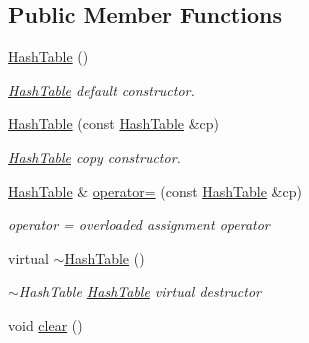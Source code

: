\subsection*{Public Member Functions}
\begin{DoxyCompactItemize}
\item 
\hypertarget{class_hash_table_adc3bf2b214c572819ba957ad314d7db3}{\hyperlink{class_hash_table_adc3bf2b214c572819ba957ad314d7db3}{Hash\-Table} ()}\label{class_hash_table_adc3bf2b214c572819ba957ad314d7db3}

\begin{DoxyCompactList}\small\item\em \hyperlink{class_hash_table}{Hash\-Table} default constructor. \end{DoxyCompactList}\item 
\hyperlink{class_hash_table_ac756b78d1ca5e613d68800b76c9bc55c}{Hash\-Table} (const \hyperlink{class_hash_table}{Hash\-Table} \&cp)
\begin{DoxyCompactList}\small\item\em \hyperlink{class_hash_table}{Hash\-Table} copy constructor. \end{DoxyCompactList}\item 
\hyperlink{class_hash_table}{Hash\-Table} \& \hyperlink{class_hash_table_aa8ac131a52516b8cb16530584bdfb021}{operator=} (const \hyperlink{class_hash_table}{Hash\-Table} \&cp)
\begin{DoxyCompactList}\small\item\em operator = overloaded assignment operator \end{DoxyCompactList}\item 
\hypertarget{class_hash_table_adc1d238b66fad676ed683172d8967f46}{virtual \hyperlink{class_hash_table_adc1d238b66fad676ed683172d8967f46}{$\sim$\-Hash\-Table} ()}\label{class_hash_table_adc1d238b66fad676ed683172d8967f46}

\begin{DoxyCompactList}\small\item\em $\sim$\-Hash\-Table \hyperlink{class_hash_table}{Hash\-Table} virtual destructor \end{DoxyCompactList}\item 
\hypertarget{class_hash_table_a94a35e0cf2ce6fa291d48138f58635ed}{void \hyperlink{class_hash_table_a94a35e0cf2ce6fa291d48138f58635ed}{clear} ()}\label{class_hash_table_a94a35e0cf2ce6fa291d48138f58635ed}


\end{DoxyCompactItemize}
